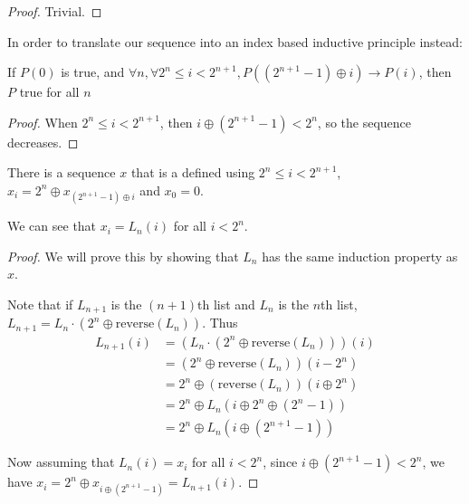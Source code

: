 \begin{proof}
    Trivial.
\end{proof}

\begin{theorem}
    \label{thm:recursion_principle}

    In order to translate our sequence into an index based inductive principle instead:
    
    If $P(0)$ is true, and $\forall n, \forall 2^n \le i < 2^{n+1}, P((2^{n+1} - 1) \oplus i) \to P(i)$, then
    $P$ true for all $n$
\end{theorem}

\begin{proof}
    When $2^n \le i < 2^{n+1}$, then $i \oplus (2^{n+1} - 1) < 2^n$, so
    the sequence decreases.
\end{proof}

\begin{definition}
    \label{def:recursive_gray_code}

    There is a sequence $x$ that is a defined using $2^n \le i < 2^{n+1}$, $x_i = 2^n \oplus x_{(2^{n+1} - 1) \oplus i}$
    and $x_0 = 0$.
\end{definition}

\begin{theorem}
    \label{thm:list_is_recursive}

    We can see that $x_i = L_n(i)$ for all $i < 2^n$. 
\end{theorem}

\begin{proof}
    We will prove this by showing that $L_n$ has the same induction property as $x$.

    Note that if $L_{n+1}$ is the $(n+1)$th list and $L_n$ is the $n$th list, $L_{n+1} = L_n \cdot (2^n \oplus \mathrm{reverse}(L_n))$. Thus
    \begin{align*}
    L_{n+1}(i) &= (L_n \cdot (2^n \oplus \mathrm{reverse}(L_n)))(i) \\
        &= (2^n \oplus \mathrm{reverse}(L_n))(i - 2^n) \\
        &= 2^n \oplus (\mathrm{reverse}(L_n))(i \oplus 2^n) \\
        &= 2^n \oplus L_n(i \oplus 2^n \oplus (2^n - 1)) \\
        &= 2^n \oplus L_n({i \oplus (2^{n+1} - 1)})
    \end{align*}

    Now assuming that $L_n(i) = x_i$ for all $i < 2^n$, since $i \oplus (2^{n+1} - 1) < 2^n$, we have
    $x_i = 2^n \oplus x_{i \oplus (2^{n+1} - 1)} = L_{n+1}(i)$.
\end{proof}

